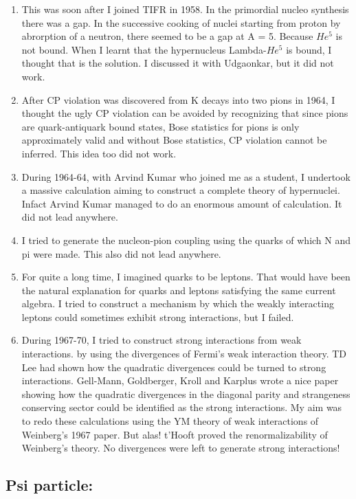 \begin{enumerate}
\itemsep=0pt
\item This was soon after I joined TIFR in 1958. In the primordial nucleo 
synthesis there was a gap. In the successive cooking of nuclei starting 
from proton by abrorption of a neutron, there seemed to be a gap at A = 
5. Because $He^5$ is not bound. When I learnt that the hypernucleus 
Lambda-$He^5$ is bound, I thought that is the solution. I discussed it 
with Udgaonkar, but it did not work.
\item After CP violation was discovered from K decays into two pions in 
1964, I thought the ugly CP violation can be avoi\-ded by recognizing that 
since pions are quark-antiquark bound states, Bose statistics for pions 
is only approxima\-tely valid and without Bose statistics, CP violation 
cannot be inferred. This idea too did not work.
\item During 1964-64, with Arvind Kumar who joined me as a studen\-t, I 
undertook a massive calculation aiming to construct a complete theory of 
hypernuclei. Infact Arvind Kumar managed to do an enormous amount of 
calculation. It did not lead anywhere.
\item I tried to generate the nucleon-pion coupling using the quarks of 
which N and pi were made. This also did not lead anywhere.
\item For quite a long time, I imagined quarks to be leptons. That would have 
been the natural explanation for quarks and leptons satisfying the same 
current algebra. I tried to construct a mechanism by which the weakly 
interacting leptons could sometimes exhibit strong interactions, but I 
failed.
\item During 1967-70, I tried to construct strong interactions fr\-om weak 
interactions. by using the divergences of Fermi's weak interaction 
theory. TD Lee had shown how the qua\-dratic divergences could be turned 
to strong interactions. Gell-Mann, Goldberger, Kroll and Karplus wrote a 
nice paper showing how the quadratic divergences in the diago\-nal parity 
and strangeness conserving sector could be identified as the strong 
interactions. My aim was to redo these calculations using the YM theory 
of weak interactions of Weinberg's 1967 paper. But alas! t'Hooft proved 
the reno\-rmalizability of Weinberg's theory. No divergences were left to 
generate strong interactions!
\end{enumerate}

\subsection*{Psi particle:}

